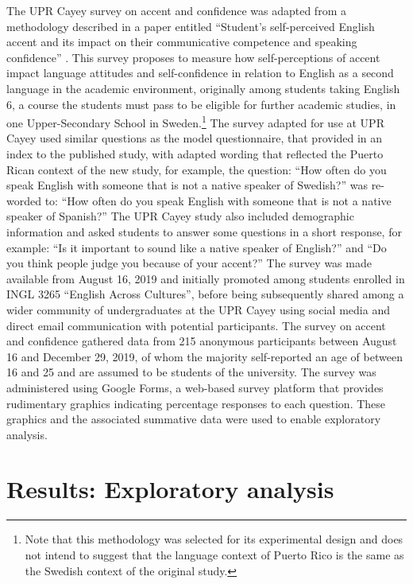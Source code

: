 \documentclass[output=paper,colorlinks,citecolor=brown]{langscibook}
\begin{document}
The UPR Cayey survey on accent and confidence was adapted from a methodology described in a paper entitled “Student’s self-perceived English accent and its impact on their communicative competence and speaking confidence” \citep{Norman_2017}. This survey proposes to measure how self-perceptions of accent impact language attitudes and self-confidence in relation to English as a second language in the academic environment, originally among students taking English 6, a course the students must pass to be eligible for further academic studies, in one Upper-Secondary School in Sweden.\footnote{Note that this methodology was selected for its experimental design and does not intend to suggest that the language context of Puerto Rico is the same as the Swedish context of the original study.} The survey adapted for use at UPR Cayey used similar questions as the model questionnaire, that \citet{Norman_2017} provided in an index to the published study, with adapted wording that reflected the Puerto Rican context of the new study, for example, the question: “How often do you speak English with someone that is not a native speaker of Swedish?” \citep[39]{Norman_2017} was re-worded to: “How often do you speak English with someone that is not a native speaker of Spanish?” The UPR Cayey study also included demographic information and asked students to answer some questions in a short response, for example: “Is it important to sound like a native speaker of English?” and “Do you think people judge you because of your accent?” The survey was made available from August 16, 2019 and initially promoted among students enrolled in INGL 3265 “English Across Cultures”, before being subsequently shared among a wider community of undergraduates at the UPR Cayey using social media and direct email communication with potential participants. The survey on accent and confidence gathered data from 215 anonymous participants between August 16 and December 29, 2019, of whom the majority self-reported an age of between 16 and 25 and are assumed to be students of the university. The survey was administered using Google Forms, a web-based survey platform that provides rudimentary graphics indicating percentage responses to each question. These graphics and the associated summative data were used to enable exploratory analysis. 


\section{Results: Exploratory analysis}
\end{document}
